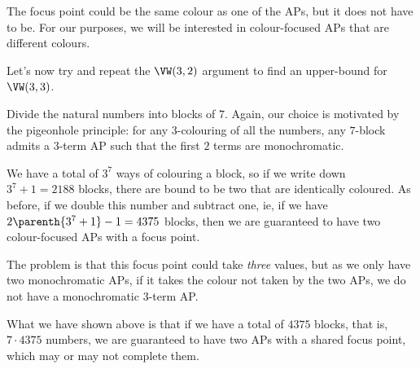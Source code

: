 The focus point could be the same colour as one of the APs, but it does not have to be. For our purposes, we will be interested in colour-focused APs that are different colours.

Let's now try and repeat the $\VW(3, 2)$ argument to find an upper-bound for $\VW(3, 3)$.

Divide the natural numbers into blocks of $7$. Again, our choice is motivated by the pigeonhole principle: for any $3$-colouring of all the numbers, any $7$-block admits a $3$-term AP such that the first $2$ terms are monochromatic.

\begin{figure}[H]
    \centering
\end{figure}

We have a total of $3^7$ ways of colouring a block, so if we write down $3^7 + 1 = 2188$ blocks, there are bound to be two that are identically coloured. As before, if we double this number and subtract one, ie, if we have $2\parenth{3^7 + 1} - 1 = 4375$ blocks, then we are guaranteed to have two colour-focused APs with a focus point.

The problem is that this focus point could take \textit{three} values, but as we only have two monochromatic APs, if it takes the colour not taken by the two APs, we do not have a monochromatic $3$-term AP.

What we have shown above is that if we have a total of $4375$ blocks, that is, $7 \cdot 4375$ numbers, we are guaranteed to have two APs with a shared focus point, which may or may not complete them.

